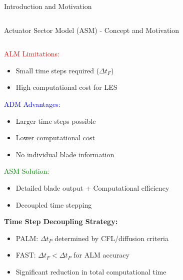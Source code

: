 \documentclass[aspectratio=1610]{beamer}
\begin{document}
\begin{frame}{Introduction and Motivation}
\begin{columns}
\begin{column}{0.4\textwidth}
            
        \end{column}
    \end{columns}
\end{frame}

\begin{frame}{Actuator Sector Model (ASM) - Concept and Motivation}
    \begin{columns}
        \begin{column}{0.6\textwidth}
                \textcolor{red}{ALM Limitations:}
                \begin{itemize}
                \small
                    \item Small time steps required ($\Delta t_F$)
                    \item High computational cost for LES
                \end{itemize}
                
                \textcolor{blue}{ADM Advantages:}
                \begin{itemize}
                \small
                    \item Larger time steps possible
                    \item Lower computational cost
                    \item No individual blade information
                \end{itemize}
                
                \textcolor{green}{ASM Solution:}
                \begin{itemize}
                \small
                    \item Detailed blade output + Computational efficiency
                    \item Decoupled time stepping
                \end{itemize}

            
            \textbf{Time Step Decoupling Strategy:}
            \begin{itemize}
            \small
                \item PALM: $\Delta t_P$ determined by CFL/diffusion criteria
                \item FAST: $\Delta t_F < \Delta t_P$ for ALM accuracy
                \item Significant reduction in total computational time
            \end{itemize}
        \end{column}
        

\end{columns}
\end{frame}
\end{document}
